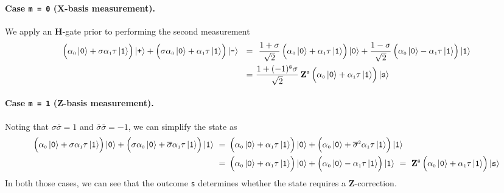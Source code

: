 \documentclass{article}
\newcommand{\parentheses}[1]{\left(\vphantom{\sum}#1\right)}
\newcommand{\Sup}[1]{^{\scriptscriptstyle #1}}
\newcommand{\sub}[1]{_{\scriptscriptstyle #1}}
\newcommand{\Op}[1]{{\bf #1}}
\newcommand{\kett}[1]{\ket{\mbox{\tt #1}}}
\begin{document}
	\paragraph{Case {\tt m = 0} (\Op{X}-basis measurement).} We apply an \Op{H}-gate prior to performing the second measurement
	\begin{align*}
		\parentheses{\alpha\sub{0}\kett{0} + \sigma\alpha\sub{1}\tau\kett{1}}\kett{+}
		+ \parentheses{\sigma\alpha\sub{0}\kett{0} + \alpha\sub{1}\tau\kett{1}}\kett{-}
		~~=&~~
			\frac{1+\sigma}{\sqrt{2}}\parentheses{\alpha\sub{0}\kett{0} + \alpha\sub{1}\tau\kett{1}}\kett{0}
			+
			\frac{1-\sigma}{\sqrt{2}}\parentheses{\alpha\sub{0}\kett{0} - \alpha\sub{1}\tau\kett{1}}\kett{1}
		\\
		~=&~ \frac{1+(-1)^{\tt s}\sigma}{\sqrt{2}} \: \Op{Z}^{\tt s}\parentheses{\alpha\sub{0}\kett{0} + \alpha\sub{1}\tau\kett{1}}\kett{s}
	\end{align*}

	\paragraph{Case {\tt m = 1} (\Op{Z}-basis measurement).} Noting that $\sigma\overline{\sigma} = 1$ and $\overline{\sigma}\overline{\sigma} = -1$, we can simplify the state as
	\begin{align*}
		\parentheses{\alpha\sub{0}\kett{0} + \sigma\alpha\sub{1}\tau\kett{1}}\kett{0}
		+ \parentheses{\sigma\alpha\sub{0}\kett{0} + \overline{\sigma}\alpha\sub{1}\tau\kett{1}}\kett{1}
		~=&~
			\parentheses{\alpha\sub{0}\kett{0} + \alpha\sub{1}\tau\kett{1}}\kett{0}
			+ \parentheses{\alpha\sub{0}\kett{0} + \overline{\sigma}\Sup{2}\alpha\sub{1}\tau\kett{1}}\kett{1}
		\\
		~=&~
			\parentheses{\alpha\sub{0}\kett{0} + \alpha\sub{1}\tau\kett{1}}\kett{0}
			+ \parentheses{\alpha\sub{0}\kett{0} - \alpha\sub{1}\tau\kett{1}}\kett{1}
		~=~
			\Op{Z}^{\tt s}\parentheses{\alpha\sub{0}\kett{0} + \alpha\sub{1}\tau\kett{1}}\kett{s}
	\end{align*}
	In both those cases, we can see that the outcome {\tt s} determines whether the state requires a \Op{Z}-correction.

	\newpage

	\begin{figure}
		\centering
	\end{figure}
\end{document}
